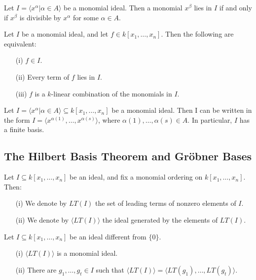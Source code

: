 \begin{lemma}
    Let $I = \langle x^{\alpha} | \alpha \in A \rangle$ be a monomial ideal.
    Then a monomial $x^{\beta}$ lies in $I$ if and only if $x^{\beta}$ is divisible by $x^{\alpha}$ for some $\alpha \in A$.
\end{lemma}

\begin{lemma}
    Let $I$ be a monomial ideal, and let $f \in k[x_1, \dots, x_n]$.
    Then the following are equivalent:
    \begin{enumerate}
        \item[(i)] $f \in I$.
        \item[(ii)] Every term of $f$ lies in $I$.
        \item[(iii)] $f$ is a $k$-linear combination of the monomials in $I$.
    \end{enumerate}
\end{lemma}

\begin{lemma}
    Let $I = \langle x^{\alpha} | \alpha \in A \rangle \subseteq k[x_1, \dots, x_n]$ be a monomial ideal.
    Then I can be written in the form $I = \langle x^{\alpha(1)}, \dots, x^{\alpha(s)} \rangle$, where $\alpha(1), \dots, \alpha(s) \in A$. In particular, $I$ has a finite basis.
\end{lemma}

\subsection{The Hilbert Basis Theorem and Gr\"obner Bases}

\begin{definition}
    Let $I \subseteq k[x_1, \dots, x_n]$ be an ideal, and fix a monomial ordering on $k[x_1, \dots, x_n]$.
    Then:
    \begin{enumerate}
        \item[(i)] We denote by $LT(I)$ the set of leading terms of nonzero elements of $I$.
        \item[(ii)] We denote by $\langle LT(I) \rangle$ the ideal generated by the elements of $LT(I)$.
    \end{enumerate}
\end{definition}

\begin{lemma}
    Let $ I \subseteq k[x_1, \dots, x_n]$ be an ideal different from $\{ 0 \}$.
    \begin{enumerate}
        \item[(i)] $\langle LT(I) \rangle$ is a monomial ideal.
        \item[(ii)] There are $g_1, \dots, g_t \in I$ such that $\langle LT(I) \rangle = \langle LT(g_1), \dots, LT(g_t) \rangle$.
    \end{enumerate}
\end{lemma}

